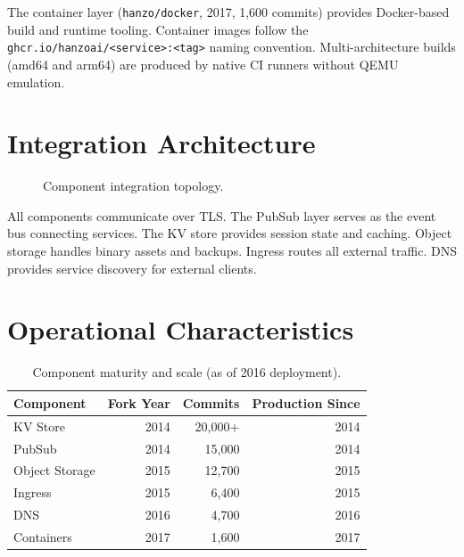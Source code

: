 \documentclass[11pt,a4paper]{article}
\begin{document}
The container layer (\texttt{hanzo/docker}, 2017, 1{,}600 commits) provides Docker-based build and runtime tooling. Container images follow the \texttt{ghcr.io/hanzoai/<service>:<tag>} naming convention. Multi-architecture builds (amd64 and arm64) are produced by native CI runners without QEMU emulation.

\section{Integration Architecture}

\begin{figure}[h]
\centering
{}
\caption{Component integration topology.}
\end{figure}

All components communicate over TLS. The PubSub layer serves as the event bus connecting services. The KV store provides session state and caching. Object storage handles binary assets and backups. Ingress routes all external traffic. DNS provides service discovery for external clients.

\section{Operational Characteristics}

\begin{table}[h]
\centering
\caption{Component maturity and scale (as of 2016 deployment).}
\begin{tabular}{lrrr}
\toprule
\textbf{Component} & \textbf{Fork Year} & \textbf{Commits} & \textbf{Production Since} \\
\midrule
KV Store    & 2014 & 20{,}000+ & 2014 \\
PubSub      & 2014 & 15{,}000  & 2014 \\
Object Storage & 2015 & 12{,}700 & 2015 \\
Ingress     & 2015 & 6{,}400   & 2015 \\
DNS         & 2016 & 4{,}700   & 2016 \\
Containers  & 2017 & 1{,}600   & 2017 \\
\bottomrule
\end{tabular}
\end{table}
\end{document}
